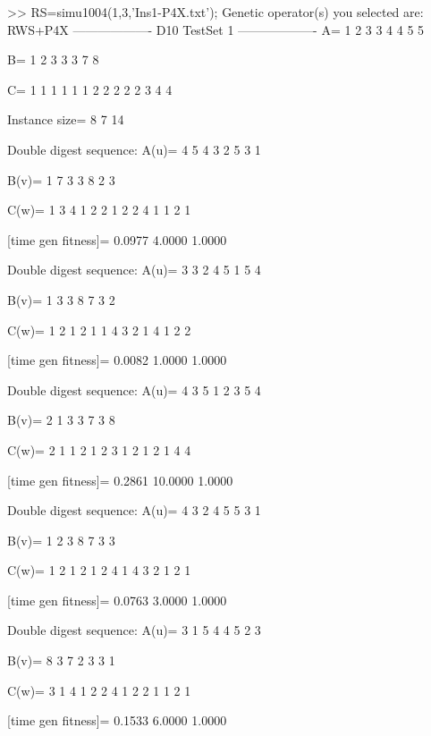 >> RS=simu1004(1,3,'Ins1-P4X.txt');
Genetic operator(s) you selected are:
RWS+P4X
------------------- D10 TestSet 1 -------------------
A=
     1     2     3     3     4     4     5     5

B=
     1     2     3     3     3     7     8

C=
     1     1     1     1     1     1     2     2     2     2     2     3     4     4

Instance size=
     8     7    14

Double digest sequence:
A(u)=
     4     5     4     3     2     5     3     1

B(v)=
     1     7     3     3     8     2     3

C(w)=
     1     3     4     1     2     2     1     2     2     4     1     1     2     1

[time gen fitness]=
    0.0977    4.0000    1.0000

Double digest sequence:
A(u)=
     3     3     2     4     5     1     5     4

B(v)=
     1     3     3     8     7     3     2

C(w)=
     1     2     1     2     1     1     4     3     2     1     4     1     2     2

[time gen fitness]=
    0.0082    1.0000    1.0000

Double digest sequence:
A(u)=
     4     3     5     1     2     3     5     4

B(v)=
     2     1     3     3     7     3     8

C(w)=
     2     1     1     2     1     2     3     1     2     1     2     1     4     4

[time gen fitness]=
    0.2861   10.0000    1.0000

Double digest sequence:
A(u)=
     4     3     2     4     5     5     3     1

B(v)=
     1     2     3     8     7     3     3

C(w)=
     1     2     1     2     1     2     4     1     4     3     2     1     2     1

[time gen fitness]=
    0.0763    3.0000    1.0000

Double digest sequence:
A(u)=
     3     1     5     4     4     5     2     3

B(v)=
     8     3     7     2     3     3     1

C(w)=
     3     1     4     1     2     2     4     1     2     2     1     1     2     1

[time gen fitness]=
    0.1533    6.0000    1.0000


